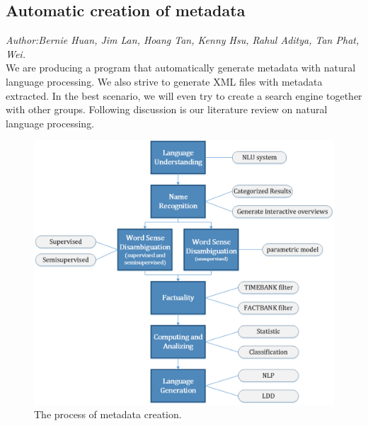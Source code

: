 
\subsection{Automatic creation of metadata}
\textit{\footnotesize Author:Bernie Huan, Jim Lan, Hoang Tan, Kenny Hsu, Rahul Aditya, Tan Phat, Wei.}\\

We are producing a program that automatically generate metadata with natural language processing. 
We also strive to generate XML files with metadata extracted. 
In the best scenario, we will even try to create a search engine together with other groups. 
Following discussion is our literature review on natural language processing.

\begin{figure}[ht]
	\begin{center}
		\includegraphics[width=1.8\columnwidth]{Union_Background_Chart_1}
	\end{center}
\caption{The process of metadata creation.}
\end{figure}

